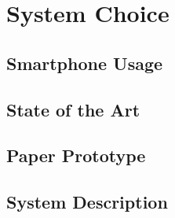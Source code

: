 \chapter{System Choice}


\section{Smartphone Usage}\label{sub:smartphone_usage}


\section{State of the Art}\label{StateOfTheArt}


\section{Paper Prototype}\label{paperPrototypeSystemChoice}


\section{System Description}\label{systemDefinition}

